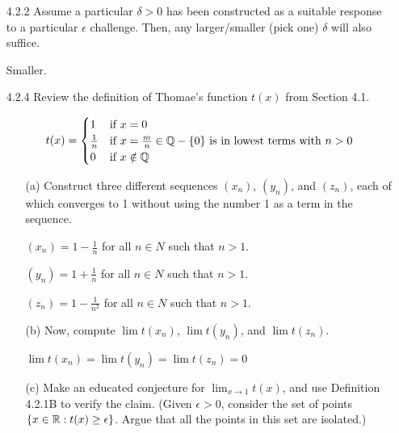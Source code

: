 \documentclass[12pt,letterpaper]{article}
\begin{document}
    \begin{itemize}[leftmargin=!,labelindent=5pt]
        \item [4.2.2] Assume a particular $\delta > 0$ has been constructed as a suitable response to a particular $\epsilon$ challenge. Then, any larger/smaller (pick one) $\delta$ will also suffice.
        
            Smaller.
        \item [4.2.4] Review the definition of Thomae’s function $t(x)$ from Section 4.1.
        
            \[ t(x) =
            \begin{cases}
                1 & \text{if } x = 0\\
                \frac{1}{n} & \text{if } x = \frac{m}{n} \in \mathbb{Q} - \{0\} \text{ is in lowest terms with } n > 0\\
                0 & \text{if } x \notin \mathbb{Q}
            \end{cases}
            \]
            \begin{itemize}
                \item [(a)] Construct three different sequences $(x_n)$, $(y_n)$, and $(z_n)$, each of which converges to 1 without using the number 1 as a term in the sequence.
                
                    $(x_n) = 1 - \frac{1}{n}$ for all $n \in N$ such that $n > 1$.

                    $(y_n) = 1 + \frac{1}{n}$ for all $n \in N$ such that $n > 1$.

                    $(z_n) = 1 - \frac{1}{n^2}$ for all $n \in N$ such that $n > 1$.
                \item [(b)] Now, compute $\lim t(x_n)$, $\lim t(y_n)$, and $\lim t(z_n)$.
                
                    $\lim t(x_n) = \lim t(y_n) = \lim t(z_n) = 0$
                \item [(c)] Make an educated conjecture for $\lim_{x \to 1} t(x)$, and use Definition 4.2.1B to verify the claim. (Given $\epsilon > 0$, consider the set of points $\{x\in \mathbb{R} : t(x) \geq \epsilon\}$. Argue that all the points in this set are isolated.)
                

\end{itemize}
\end{itemize}
\end{document}
